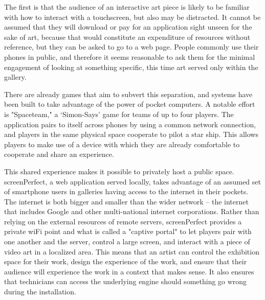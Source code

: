 The first is that the audience of an interactive art piece is likely to be familiar with how to interact with a touchscreen, but also may be distracted. It cannot be assumed that they will download or pay for an application sight unseen for the sake of art, because that would constitute an expenditure of resources without reference, but they can be asked to go to a web page. People commonly use their phones in public, and therefore it seems reasonable to ask them for the minimal engagement of looking at something specific, this time art served only within the gallery. 

There are already games that aim to subvert this separation, and systems have been built to take advantage of the power of pocket computers. A notable effort is "Spaceteam," \parencite{spaceteam} a ‘Simon-Says' game for teams of up to four players. The application pairs to itself across phones by using a common network connection, and players in the same physical space cooperate to pilot a star ship. This allows players to make use of a device with which they are already comfortable to cooperate and share an experience.

This shared experience makes it possible to privately host a public space. screenPerfect, a web application served locally, takes advantage of an assumed set of smartphone users in galleries having access to the internet in their pockets. The internet is both bigger and smaller than the wider network – the internet that includes Google and other multi-national internet corporations. Rather than relying on the external resources of remote servers, screenPerfect provides a private wiFi point and what is called a "captive portal" to let players pair with one another and the server, control a large screen, and interact with a piece of video art in a localized area. This means that an artist can control the exhibition space for their work, design the experience of the work, and ensure that their audience will experience the work in a context that makes sense. It also ensures that technicians can access the underlying engine should something go wrong during the installation.

